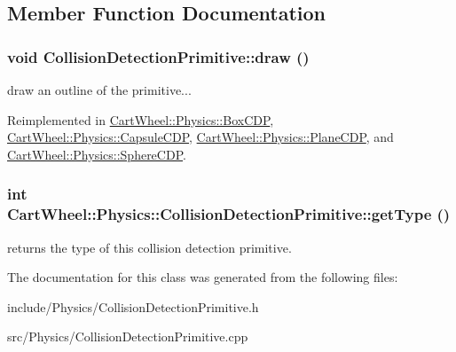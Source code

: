 \subsection{Member Function Documentation}
\hypertarget{classCartWheel_1_1Physics_1_1CollisionDetectionPrimitive_a26c85561d35a7df8bb48697da9c1cb10}{
\subsubsection[{draw}]{\setlength{\rightskip}{0pt plus 5cm}void CollisionDetectionPrimitive::draw ()}}
\label{classCartWheel_1_1Physics_1_1CollisionDetectionPrimitive_a26c85561d35a7df8bb48697da9c1cb10}
draw an outline of the primitive... 

Reimplemented in \hyperlink{classCartWheel_1_1Physics_1_1BoxCDP_a30fe03a4419ba85988a0d909b42f9c3d}{CartWheel::Physics::BoxCDP}, \hyperlink{classCartWheel_1_1Physics_1_1CapsuleCDP_a0b2d496f52bbe790ea08846e0f951d63}{CartWheel::Physics::CapsuleCDP}, \hyperlink{classCartWheel_1_1Physics_1_1PlaneCDP_af05d808b4b8c86c3737bbe05ee624cd9}{CartWheel::Physics::PlaneCDP}, and \hyperlink{classCartWheel_1_1Physics_1_1SphereCDP_a02bb51012ee7279a7369fc451276a22f}{CartWheel::Physics::SphereCDP}.

\hypertarget{classCartWheel_1_1Physics_1_1CollisionDetectionPrimitive_a2720a47fe87d1c3dacec7deefced481c}{
\subsubsection[{getType}]{\setlength{\rightskip}{0pt plus 5cm}int CartWheel::Physics::CollisionDetectionPrimitive::getType ()}}
\label{classCartWheel_1_1Physics_1_1CollisionDetectionPrimitive_a2720a47fe87d1c3dacec7deefced481c}
returns the type of this collision detection primitive. 

The documentation for this class was generated from the following files:\begin{DoxyCompactItemize}
\item 
include/Physics/CollisionDetectionPrimitive.h\item 
src/Physics/CollisionDetectionPrimitive.cpp\end{DoxyCompactItemize}
